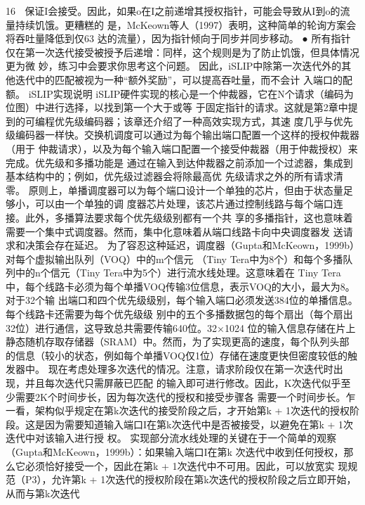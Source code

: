                                                   16
   保证I会接受。因此，如果o在I之前递增其授权指针，可能会导致从I到o的流量持续饥饿。更糟糕的
   是，McKeown等人（1997）表明，这种简单的轮询方案会将吞吐量降低到仅63%
   达的流量），因为指针倾向于同步并同步移动。
 ● 所有指针仅在第一次迭代接受被授予后递增：同样，这个规则是为了防止饥饿，但具体情况更为微
   妙，练习中会要求你思考这个问题。
因此，iSLIP中除第一次迭代外的其他迭代中的匹配被视为一种“额外奖励”，可以提高吞吐量，而不会计
入端口的配额。
iSLIP实现说明
iSLIP硬件实现的核心是一个仲裁器，它在N个请求（编码为位图）中进行选择，以找到第一个大于或等
于固定指针的请求。这就是第2章中提到的可编程优先级编码器；该章还介绍了一种高效实现方式，其速
度几乎与优先级编码器一样快。交换机调度可以通过为每个输出端口配置一个这样的授权仲裁器（用于
仲裁请求），以及为每个输入端口配置一个接受仲裁器（用于仲裁授权）来完成。优先级和多播功能是
通过在输入到达仲裁器之前添加一个过滤器，集成到基本结构中的；例如，优先级过滤器会将除最高优
先级请求之外的所有请求清零。
原则上，单播调度器可以为每个端口设计一个单独的芯片，但由于状态量足够小，可以由一个单独的调
度器芯片处理，该芯片通过控制线路与每个端口连接。此外，多播算法要求每个优先级级别都有一个共
享的多播指针，这也意味着需要一个集中式调度器。然而，集中化意味着从端口线路卡向中央调度器发
送请求和决策会存在延迟。
为了容忍这种延迟，调度器（Gupta和McKeown，1999b）对每个虚拟输出队列（VOQ）中的m个信元
（Tiny Tera中为8个）和每个多播队列中的n个信元（Tiny Tera中为5个）进行流水线处理。这意味着在
Tiny Tera中，每个线路卡必须为每个单播VOQ传输3位信息，表示VOQ的大小，最大为8。对于32个输
出端口和四个优先级级别，每个输入端口必须发送384位的单播信息。每个线路卡还需要为每个优先级级
别中的五个多播数据包的每个扇出（每个扇出32位）进行通信，这导致总共需要传输640位。32×1024
位的输入信息存储在片上静态随机存取存储器（SRAM）中。然而，为了实现更高的速度，每个队列头部
的信息（较小的状态，例如每个单播VOQ仅1位）存储在速度更快但密度较低的触发器中。
现在考虑处理多次迭代的情况。注意，请求阶段仅在第一次迭代时出现，并且每次迭代只需屏蔽已匹配
的输入即可进行修改。因此，K次迭代似乎至少需要2K个时间步长，因为每次迭代的授权和接受步骤各
需要一个时间步长。乍一看，架构似乎规定在第k次迭代的接受阶段之后，才开始第k + 1次迭代的授权阶
段。这是因为需要知道输入端口I在第k次迭代中是否被接受，以避免在第k + 1次迭代中对该输入进行授
权。
实现部分流水线处理的关键在于一个简单的观察（Gupta和McKeown，1999b）：如果输入端口I在第k
次迭代中收到任何授权，那么它必须恰好接受一个，因此在第k + 1次迭代中不可用。因此，可以放宽实
现规范（P3），允许第k + 1次迭代的授权阶段在第k次迭代的授权阶段之后立即开始，从而与第k次迭代

